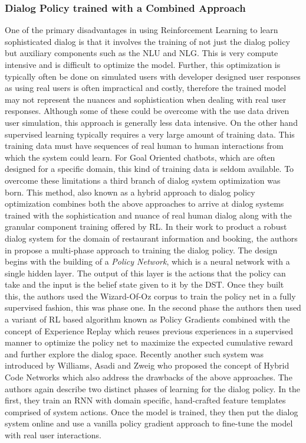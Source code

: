 \documentclass[14pt]{extarticle}
\numberwithin{equation}{section}
\begin{document}
	\subsubsection{Dialog Policy trained with a Combined Approach}
	One of the primary disadvantages in using Reinforcement Learning to learn sophisticated dialog is that it involves the training of not just the dialog policy but auxiliary components such as the NLU and NLG. This is very compute intensive and is difficult to optimize the model. Further, this optimization is typically often be done on simulated users with developer designed user responses as using real users is often impractical and costly, therefore the trained model may not represent the nuances and sophistication when dealing with real user responses.
	Although some of these could be overcome with the use data driven user simulation, this approach is generally less data intensive.
	 On the other hand supervised learning typically requires a very large amount of training data. This training data must have sequences of real human to human interactions from which the system could learn. For Goal Oriented chatbots, which are often designed for a specific domain, this kind of training data is seldom available. To overcome these limitations a third branch of dialog system optimization was born. This method, also known as a hybrid approach to dialog policy optimization combines both the above approaches to arrive at dialog systems trained with the sophistication and nuance of real human dialog along with the granular component training offered by RL. In their work to product a robust dialog system for the domain of restaurant information and booking, the authors in \cite{Su_continous_dm} propose a multi-phase approach to training the dialog policy. The design begins with the building of a \textit{Policy Network}, which is a neural network with a single hidden layer. The output of this layer is the actions that the policy can take and the input is the belief state given to it by the DST. Once they built this, the authors used the Wizard-Of-Oz corpus to train the policy net in a fully supervised fashion, this was phase one. In the second phase the authors then used a variant\cite{Schulman_trpo} of RL based algorithm known as Policy Gradients \cite{Sutton_pg} combined with the concept of Experience Replay\cite{Lin1992} which reuses previous experiences in a supervised manner to optimize the policy net to maximize the expected cumulative reward and further explore the dialog space. Recently another such system was introduced by Williams, Asadi and Zweig who proposed the concept of Hybrid Code Networks\cite{Williams_HCN_e2e} which  also address the drawbacks of the above approaches. The authors again describe two distinct phases of learning for the dialog policy. In the first, they train an RNN with domain specific, hand-crafted feature templates comprised of system actions. Once the model is trained, they then put the dialog system online and use a vanilla policy gradient\cite{Sutton_pg} approach to fine-tune the model with real user interactions. 
\end{document}
